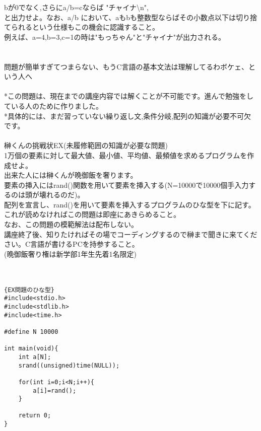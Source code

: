 \documentclass[a4j,titlepage,dvipdfmx]{jsarticle}   %
\begin{document}
bが0でなく,さらにa/b=cならば "チャイナ\textbackslash n",\\
と出力せよ。なお、a/b において、aもbも整数型ならばその小数点以下は切り捨てられるという仕様もこの機会に認識すること。\\
例えば、a=4,b=3,c=1の時は"もっちゃん"と"チャイナ"が出力される。\\
\\
\\
問題が簡単すぎてつまらない、もうC言語の基本文法は理解してるわボケェ、という人へ\\
\\
*この問題は、現在までの講座内容では解くことが不可能です。進んで勉強をしている人のために作りました。\\
*具体的には、まだ習っていない繰り返し文,条件分岐,配列の知識が必要不可欠です。\\
\\
榊くんの挑戦状EX(未履修範囲の知識が必要な問題)\\
1万個の要素に対して最大値、最小値、平均値、最頻値を求めるプログラムを作成せよ。\\
出来た人には榊くんが晩御飯を奢ります。\\
要素の挿入にはrand()関数を用いて要素を挿入する(N=10000で10000個手入力するのは頭が壊れるのだ)。\\
配列を宣言し、rand()を用いて要素を挿入するプログラムのひな型を下に記す。これが読めなければこの問題は即座にあきらめること。\\
なお、この問題の模範解法は配布しない。\\
講座終了後、知りたければその場でコーディングするので榊まで聞きに来てください。C言語が書けるPCを持参すること。\\
(晩御飯奢り権は新学部1年生先着1名限定)\\
\\
\\
\begin{lstlisting}{EX問題のひな型}
#include<stdio.h>
#include<stdlib.h>
#include<time.h>

#define N 10000

int main(void){
	int a[N];
	srand((unsigned)time(NULL));
	
	for(int i=0;i<N;i++){
		a[i]=rand();
	}
	
	return 0;
}
\end{lstlisting}
\end{document}
